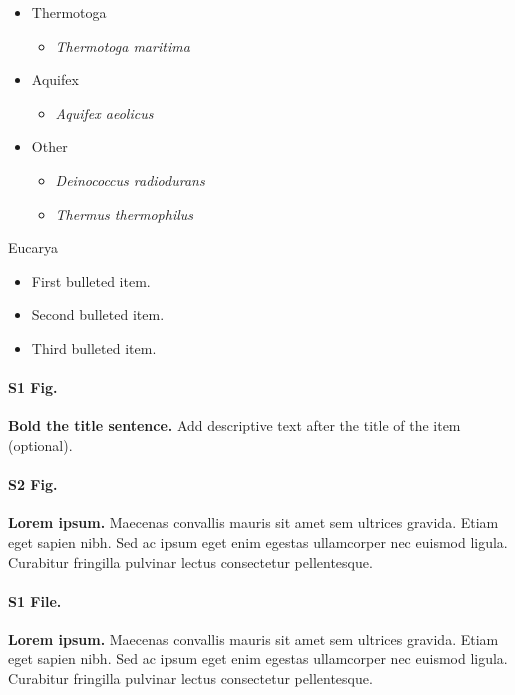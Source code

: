 \documentclass[10pt,letterpaper]{article}
\begin{document}
\begin{itemize}
\begin{itemize}
	\end{itemize}
	\item Thermotoga
	\begin{itemize}
		\item \textit{Thermotoga maritima}
	\end{itemize}
	\item Aquifex
	\begin{itemize}
		\item \textit{Aquifex aeolicus}
	\end{itemize}
	\item Other
	\begin{itemize}
		\item \textit{Deinococcus radiodurans}
		\item \textit{Thermus thermophilus}
	\end{itemize}
\end{itemize}


Eucarya

\begin{itemize}
	\item First bulleted item.
	\item Second bulleted item.
	\item Third bulleted item.
\end{itemize}

\paragraph*{S1 Fig.}
\label{S1_Fig}
{\bf Bold the title sentence.} Add descriptive text after the title of the item (optional).

\paragraph*{S2 Fig.}
\label{S2_Fig}
{\bf Lorem ipsum.} Maecenas convallis mauris sit amet sem ultrices gravida. Etiam eget sapien nibh. Sed ac ipsum eget enim egestas ullamcorper nec euismod ligula. Curabitur fringilla pulvinar lectus consectetur pellentesque.

\paragraph*{S1 File.}
\label{S1_File}
{\bf Lorem ipsum.}  Maecenas convallis mauris sit amet sem ultrices gravida. Etiam eget sapien nibh. Sed ac ipsum eget enim egestas ullamcorper nec euismod ligula. Curabitur fringilla pulvinar lectus consectetur pellentesque.
\end{document}
